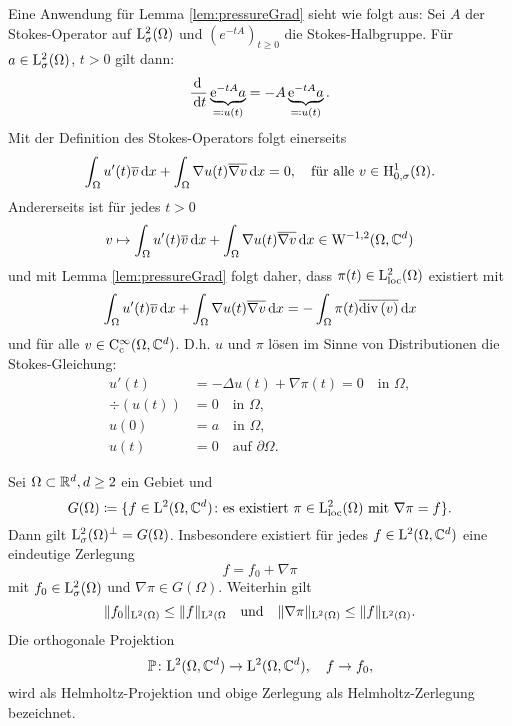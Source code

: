 Eine Anwendung für Lemma \ref{lem:pressureGrad} sieht wie folgt aus:
Sei $A$ der Stokes-Operator auf $\mathrm{L}^2_\sigma(\Omega)$ und $(e^{-tA})_{t \geq 0}$ die Stokes-Halbgruppe.
Für $a \in \mathrm{L}^2_\sigma(\Omega)$, $t > 0$ gilt dann:
$$
\frac{\, {\operatorname{d}\!{\ }}}{\, {\operatorname{d}\!{t}}} \underbrace{\mathrm{e}^{-tA} a}_{\eqqcolon u(t)} = - A \underbrace{\mathrm{e}^{-t A} a}_{\eqqcolon u(t)}.
$$
Mit der Definition des Stokes-Operators folgt einerseits
$$
\int_\Omega u'(t) \overline v \, {\operatorname{d}\!{x}} + \int_\Omega \nabla u(t)  \overline{\nabla v} \, {\operatorname{d}\!{x}}= 0, \quad\text{für alle } v \in \mathrm{H}^1_{0,\sigma}(\Omega).
$$
Andererseits ist für jedes $t > 0$ 
$$
v \mapsto \int_\Omega u'(t) \overline v \, {\operatorname{d}\!{x}} + \int_\Omega \nabla u(t) \overline{\nabla v} \, {\operatorname{d}\!{x}} \in \mathrm{W}^{-1,2}(\Omega, \mathbb{C}^d)
$$
und mit Lemma \ref{lem:pressureGrad} folgt daher, dass $\pi(t) \in \mathrm{L}^2_{\operatorname{loc}}(\Omega)$ existiert mit
$$
\int_\Omega u'(t) \overline v \, {\operatorname{d}\!{x}} + \int_\Omega \nabla u(t) \overline{\nabla v} \, {\operatorname{d}\!{x}} = -\int_\Omega \pi(t) \overline{\mathrm{div\,} (v)} \, {\operatorname{d}\!{x}}
$$
und für alle $v \in \mathrm{C}_{\mathrm{c}}^\infty(\Omega, \mathbb{C}^d)$.
D.h. $u$ und $\pi$ lösen im Sinne von Distributionen die Stokes-Gleichung:
\begin{align*}
  u'(t) &= -\Delta u(t) + \nabla \pi(t) = 0 \quad\text{in } \Omega, \\
  \div(u(t)) &= 0 \quad\text{in } \Omega, \\
  u(0) &= a \quad\text{in }  \Omega, \\
  u(t)  &= 0 \quad\text{auf } \partial\Omega.
\end{align*}

\begin{thm}
  Sei $\Omega \subset \mathbb{R}^d, d \geq 2$ ein Gebiet und
  $$
  G(\Omega) \coloneqq \{ f \in \mathrm{L}^2(\Omega, \mathbb{C}^d) \colon \text{es existiert } \pi \in \mathrm{L}^2_{\operatorname{loc}}(\Omega) \text{ mit } \nabla \pi = f \}.
  $$
  Dann gilt $\mathrm{L}^2_\sigma(\Omega)^\perp = G(\Omega)$.
  Insbesondere existiert für jedes $f \in \mathrm{L}^2(\Omega, \mathbb{C}^d)$ eine eindeutige Zerlegung
  $$
  f = f_0 + \nabla \pi
  $$
  mit $f_0 \in \mathrm{L}^2_\sigma(\Omega)$ und $\nabla\pi \in G(\Omega)$.
  Weiterhin gilt
  $$
  \|f_0\|_{\mathrm{L}^2(\Omega)} \leq \|f\|_{\mathrm{L}^2(\Omega} \quad\text{und}\quad \|\nabla\pi \|_{\mathrm{L}^2(\Omega)} \leq \|f\|_{\mathrm{L}^2(\Omega)}.
  $$
  Die orthogonale Projektion 
  $$
  \operatorname{\mathbb{P}} \colon \mathrm{L}^2(\Omega, \mathbb{C}^d) \to \mathrm{L}^2(\Omega, \mathbb{C}^d), \quad f \to f_0,
  $$
  wird als Helmholtz-Projektion und obige Zerlegung als Helmholtz-Zerlegung bezeichnet.
\end{thm}

